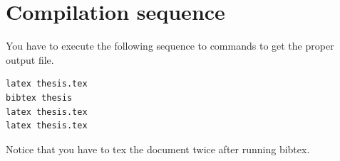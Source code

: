 \documentclass[a4paper,twoside]{iiththesis}
\begin{document}
\section{Compilation sequence}
You have to execute the following sequence to commands to get the proper output file.
\begin{verbatim}
latex thesis.tex
bibtex thesis
latex thesis.tex
latex thesis.tex
\end{verbatim}
Notice that you have to tex the document twice after running bibtex.\\

\clearpage
\newpage
{} %


\end{document}
